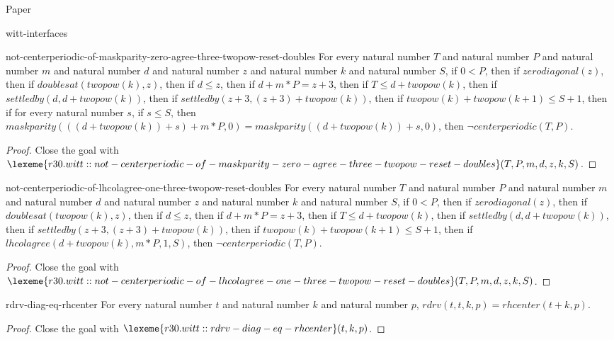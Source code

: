 \begin{lexlean}{Paper}
\begin{section}{witt-interfaces}
  \begin{theorem}{not-centerperiodic-of-maskparity-zero-agree-three-twopow-reset-doubles}
  For every natural number \(T\) and natural number \(P\) and natural number \(m\) and natural number \(d\) and natural number \(z\) and natural number \(k\) and natural number \(S\), if \(0 < P\), then if \(zerodiagonal(z)\), then if \(doublesat(twopow(k), z)\), then if \(d ≤ z\), then if \(d + m * P = z + 3\), then if \(T ≤ d + twopow(k)\), then if \(settledby(d, d + twopow(k))\), then if \(settledby(z + 3, (z + 3) + twopow(k))\), then if \(twopow(k) + twopow(k + 1) ≤ S + 1\), then if for every natural number \(s\), if \(s ≤ S\), then \(maskparity(((d + twopow(k)) + s) + m * P, 0) = maskparity((d + twopow(k)) + s, 0)\), then \(¬ centerperiodic(T, P)\).
  \begin{proof}
  Close the goal with \(\lexeme{r30.witt::not-centerperiodic-of-maskparity-zero-agree-three-twopow-reset-doubles}(T, P, m, d, z, k, S)\).
  \end{proof}
  \end{theorem}

  \begin{theorem}{not-centerperiodic-of-lhcolagree-one-three-twopow-reset-doubles}
  For every natural number \(T\) and natural number \(P\) and natural number \(m\) and natural number \(d\) and natural number \(z\) and natural number \(k\) and natural number \(S\), if \(0 < P\), then if \(zerodiagonal(z)\), then if \(doublesat(twopow(k), z)\), then if \(d ≤ z\), then if \(d + m * P = z + 3\), then if \(T ≤ d + twopow(k)\), then if \(settledby(d, d + twopow(k))\), then if \(settledby(z + 3, (z + 3) + twopow(k))\), then if \(twopow(k) + twopow(k + 1) ≤ S + 1\), then if \(lhcolagree(d + twopow(k), m * P, 1, S)\), then \(¬ centerperiodic(T, P)\).
  \begin{proof}
  Close the goal with \(\lexeme{r30.witt::not-centerperiodic-of-lhcolagree-one-three-twopow-reset-doubles}(T, P, m, d, z, k, S)\).
  \end{proof}
  \end{theorem}

  \begin{theorem}{rdrv-diag-eq-rhcenter}
  For every natural number \(t\) and natural number \(k\) and natural number \(p\), \(rdrv(t, t, k, p) = rhcenter(t + k, p)\).
  \begin{proof}
  Close the goal with \(\lexeme{r30.witt::rdrv-diag-eq-rhcenter}(t, k, p)\).
  \end{proof}
  \end{theorem}


\end{section}
\end{lexlean}
